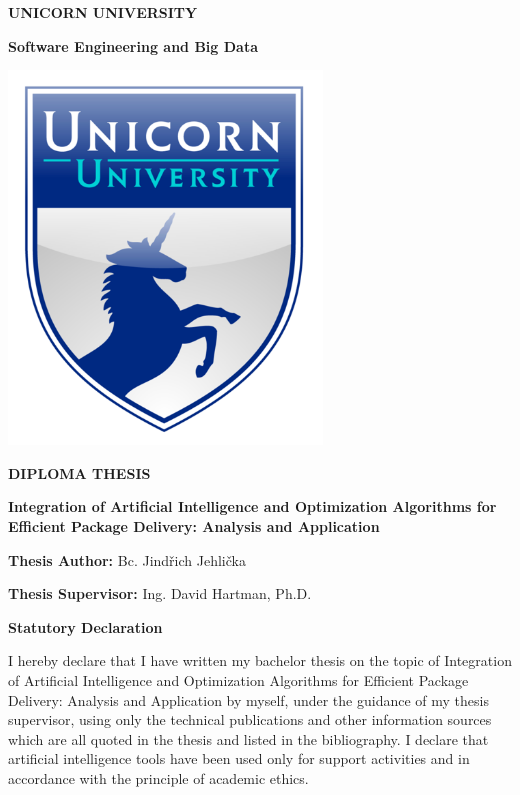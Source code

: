 \documentclass{article}
\author{}
\date{}
\begin{document}
    \pagebreak

    \thispagestyle{empty}

    \begin{center}
        \textbf{UNICORN UNIVERSITY}

        \textbf{Software Engineering and Big Data}

        \includegraphics[width=3.27778in,height=3.90671in]{logo.png}

        \textbf{DIPLOMA THESIS}

        \textbf{Integration of Artificial Intelligence and Optimization Algorithms for Efficient Package Delivery: Analysis and Application}
    \end{center}

    \vfill

    \begin{flushleft}
        \textbf{Thesis Author:} Bc. Jindřich Jehlička

        \textbf{Thesis Supervisor:} Ing. David Hartman, Ph.D.
    \end{flushleft}

    \newpage
    \thispagestyle{empty}


    \textbf{Statutory Declaration}


    I hereby declare that I have written my bachelor thesis on the topic of Integration of Artificial Intelligence and Optimization Algorithms for Efficient Package Delivery: Analysis and Application by myself, under the guidance of my thesis supervisor, using only the technical publications and other information sources which are all quoted in the thesis and listed in the bibliography. I declare that artificial intelligence tools have been used only for support activities and in accordance with the principle of academic ethics.
\end{document}
